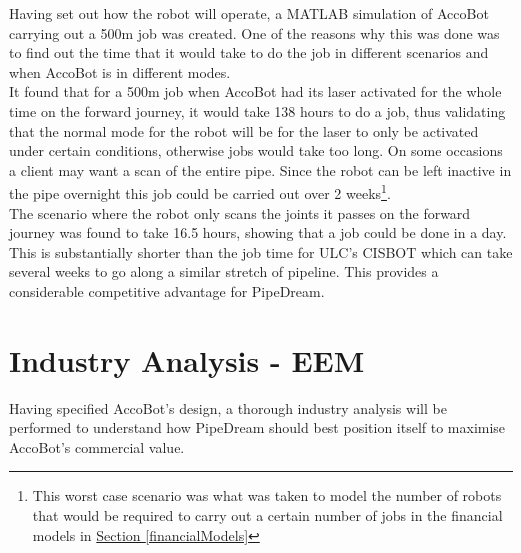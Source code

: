 \documentclass[11pt]{article}		%
\newcommand{\sectref}[1]{\hyperref[#1]{Section \ref*{#1}}}     %
\begin{document}
	    Having set out how the robot will operate, a MATLAB simulation of AccoBot carrying out a 500m job was created. One of the reasons why this was done was to find out the time that it would take to do the job in different scenarios and when AccoBot is in different modes. \\ \hspace*{2ex}
	    It found that for a 500m job when AccoBot had its laser activated for the whole time on the forward journey, it would take 138 hours to do a job, thus validating that the normal mode for the robot will be for the laser to only be activated under certain conditions, otherwise jobs would take too long. On some occasions a client may want a scan of the entire pipe. Since the robot can be left inactive in the pipe overnight this job could be carried out over 2 weeks\footnote{This worst case scenario was what was taken to model the number of robots that would be required to carry out a certain number of jobs in the financial models in \sectref{financialModels}}.
	    \\
        \hspace*{2ex}The scenario where the robot only scans the joints it passes on the forward journey was found to take 16.5 hours, showing that a job could be done in a day. This is substantially shorter than the job time for ULC's CISBOT which can take several weeks to go along a similar stretch of pipeline. This provides a considerable competitive advantage for PipeDream.

	\section{Industry Analysis - EEM}
		
	Having specified AccoBot's design, a thorough industry analysis will be performed to understand how PipeDream should best position itself to maximise AccoBot's commercial value. 
		
\end{document}
